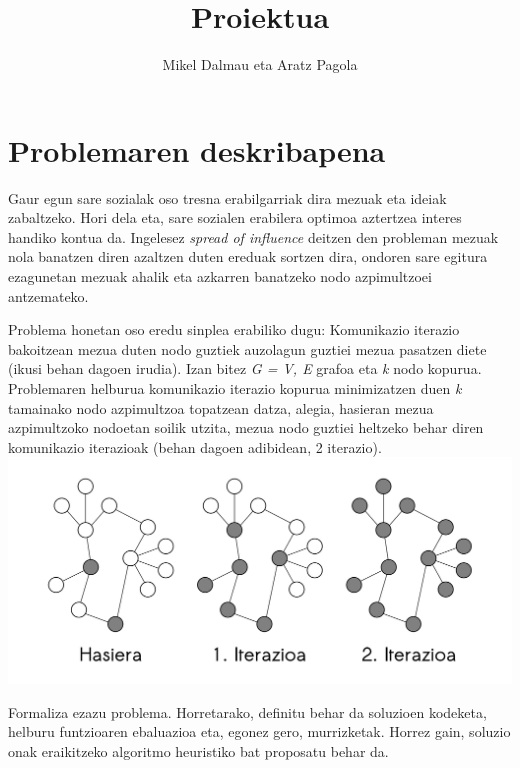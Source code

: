 \documentclass[eu,gi]{ifirak}\usepackage[]{graphicx}\usepackage[]{color}
\begin{document}
\title{Proiektua}
\author{Mikel Dalmau eta Aratz Pagola}

\maketitle







\tableofcontents
\pagebreak

\section{Problemaren deskribapena}
Gaur egun sare sozialak oso tresna erabilgarriak dira mezuak eta ideiak zabaltzeko. Hori dela eta, sare sozialen
erabilera optimoa aztertzea interes handiko kontua da. Ingelesez \textit{spread of influence} deitzen den probleman
mezuak nola banatzen diren azaltzen duten ereduak sortzen dira, ondoren sare egitura ezagunetan mezuak
ahalik eta azkarren banatzeko nodo azpimultzoei antzemateko.\

Problema honetan oso eredu sinplea erabiliko dugu: Komunikazio iterazio bakoitzean mezua duten nodo
guztiek auzolagun guztiei mezua pasatzen diete (ikusi behan dagoen irudia). Izan bitez \textit{G = {V, E}} grafoa eta
\textit{k} nodo kopurua. Problemaren helburua komunikazio iterazio kopurua minimizatzen duen \textit{k} tamainako nodo
azpimultzoa topatzean datza, alegia, hasieran mezua azpimultzoko nodoetan soilik utzita, mezua nodo guztiei
heltzeko behar diren komunikazio iterazioak (behan dagoen adibidean, 2 iterazio).\\

\includegraphics[scale=0.20]{adibide.png}  
 
Formaliza ezazu problema. Horretarako, definitu behar da soluzioen kodeketa, helburu funtzioaren ebaluazioa
eta, egonez gero, murrizketak. Horrez gain, soluzio onak eraikitzeko algoritmo heuristiko bat proposatu
behar da.\\
\end{document}
